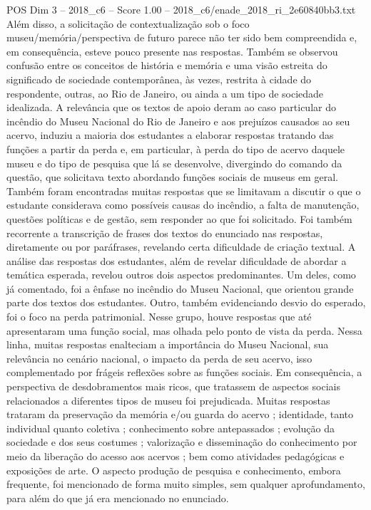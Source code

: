 \begin{textsample}{POS Dim 3 – 2018\_c6 – Score 1.00 – 2018\_c6/enade\_2018\_ri\_2e60840bb3.txt}
Além disso, a solicitação de contextualização sob o foco museu/memória/perspectiva de futuro parece não ter sido bem compreendida e, em consequência, esteve pouco presente nas respostas.
Também se observou confusão entre os conceitos de história e memória e uma visão estreita do significado de sociedade contemporânea, às vezes, restrita à cidade do respondente, outras, ao Rio de Janeiro, ou ainda a um tipo de sociedade idealizada.
A relevância que os textos de apoio deram ao caso particular do incêndio do Museu Nacional do Rio de Janeiro e aos prejuízos causados ao seu acervo, induziu a maioria dos estudantes a elaborar respostas tratando das funções a partir da perda e, em particular, à perda do tipo de acervo daquele museu e do tipo de pesquisa que lá se desenvolve, divergindo do comando da questão, que solicitava texto abordando funções sociais de museus em geral.
Também foram encontradas muitas respostas que se limitavam a discutir o que o estudante considerava como possíveis causas do incêndio, a falta de manutenção, questões políticas e de gestão, sem responder ao que foi solicitado.
Foi também recorrente a transcrição de frases dos textos do enunciado nas respostas, diretamente ou por paráfrases, revelando certa dificuldade de criação textual.
A análise das respostas dos estudantes, além de revelar dificuldade de abordar a temática esperada, revelou outros dois aspectos predominantes.
Um deles, como já comentado, foi a ênfase no incêndio do Museu Nacional, que orientou grande parte dos textos dos estudantes.
Outro, também evidenciando desvio do esperado, foi o foco na perda patrimonial.
Nesse grupo, houve respostas que até apresentaram uma função social, mas olhada pelo ponto de vista da perda.
Nessa linha, muitas respostas enalteciam a importância do Museu Nacional, sua relevância no cenário nacional, o impacto da perda de seu acervo, isso complementado por frágeis reflexões sobre as funções sociais.
Em consequência, a perspectiva de desdobramentos mais ricos, que tratassem de aspectos sociais relacionados a diferentes tipos de museu foi prejudicada.
Muitas respostas trataram da preservação da memória e/ou guarda do acervo ; identidade, tanto individual quanto coletiva ; conhecimento sobre antepassados ; evolução da sociedade e dos seus costumes ; valorização e disseminação do conhecimento por meio da liberação do acesso aos acervos ; bem como atividades pedagógicas e exposições de arte.
O aspecto produção de pesquisa e conhecimento, embora frequente, foi mencionado de forma muito simples, sem qualquer aprofundamento, para além do que já era mencionado no enunciado.

\end{textsample}
